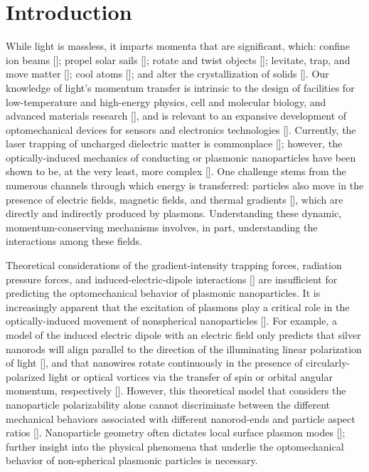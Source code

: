 \section{Introduction}
While light is massless, it imparts momenta that are significant, which: confine ion beams [\cite{Petrich1993}]; propel solar sails [\cite{Janhunen2007}]; rotate and twist objects [\cite{Beth1936, Paterson2001, Tsai2014}]; levitate, trap, and move matter [\cite{Laboratories1997, NieminenRev, Novotny1997}]; cool atoms [\cite{Weiner1999}]; and alter the crystallization of solids [\cite{Chowdhury1985}]. Our knowledge of light's momentum transfer is intrinsic to the design of facilities for low-temperature and high-energy physics, cell and molecular biology, and advanced materials research [\cite{Laboratories1997}], and is relevant to an expansive development of optomechanical devices for sensors and electronics technologies [\cite{Hugel2002, Kippenberg2007, Thourhout2010}].  Currently, the laser trapping of uncharged dielectric matter is commonplace [\cite{Laboratories1997}]; however, the optically-induced mechanics of conducting or plasmonic nanoparticles have been shown to be, at the very least, more complex [\cite{Dienerowitz2008, Saija2009, Shvedov2010, Yan2012, Yan2012a, Yan2013, Yan2013a, Yan2013b}]. One challenge stems from the numerous channels through which energy is transferred: particles also move in the presence of electric fields, magnetic fields, and thermal gradients [\cite{Bhatt, Keshoju, Edwards2006}], which are directly and indirectly produced by plasmons.  Understanding these dynamic, momentum-conserving mechanisms involves, in part, understanding the interactions among these fields.


Theoretical considerations of the gradient-intensity trapping forces, radiation pressure forces, and induced-electric-dipole interactions [\cite{Laboratories1997}] are insufficient for predicting the optomechanical behavior of plasmonic nanoparticles.  It is increasingly apparent that the excitation of plasmons play a critical role in the optically-induced movement of nonspherical nanoparticles [\cite{Yan2013}]. For example, a model of the induced electric dipole with an electric field only predicts that silver nanorods will align parallel to the direction of the illuminating linear polarization of light [\cite{Tong}], and that nanowires rotate continuously in the presence of circularly-polarized light or optical vortices via the transfer of spin or orbital angular momentum, respectively [\cite{Yan2013a, Lehmuskero1, Lehmuskero:14}]. However, this theoretical model that considers the nanoparticle polarizability alone cannot discriminate between the different mechanical behaviors associated with different nanorod-ends and particle aspect ratios [\cite{Tong}].  Nanoparticle geometry often dictates local surface plasmon modes [\cite{Knight2007}]; further insight into the physical phenomena that underlie the optomechanical behavior of non-spherical plasmonic particles is necessary.


